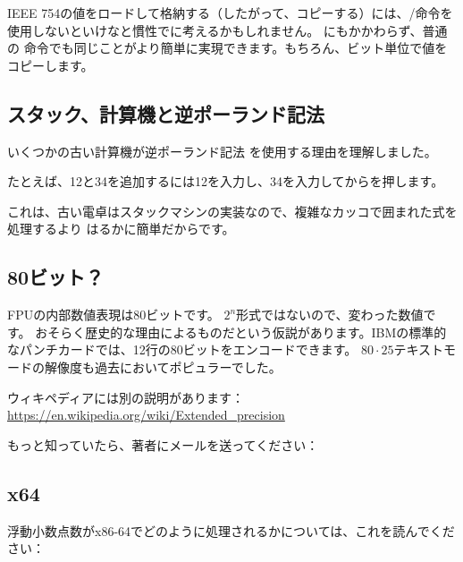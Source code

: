 IEEE 754の値をロードして格納する（したがって、コピーする）には、/命令を使用しないといけなと慣性でに考えるかもしれません。
にもかかわらず、普通の \MOV 命令でも同じことがより簡単に実現できます。もちろん、ビット単位で値をコピーします。

\subsection{スタック、計算機と逆ポーランド記法}


いくつかの古い計算機が逆ポーランド記法
を使用する理由を理解しました。

たとえば、12と34を追加するには12を入力し、34を入力してからを押します。

これは、古い電卓はスタックマシンの実装なので、複雑なカッコで囲まれた式を処理するより
はるかに簡単だからです。


\subsection{80ビット？}

FPUの内部数値表現は80ビットです。
$2^n$形式ではないので、変わった数値です。
おそらく歴史的な理由によるものだという仮説があります。IBMの標準的なパンチカードでは、12行の80ビットをエンコードできます。 
$80\cdot 25$テキストモードの解像度も過去においてポピュラーでした。

ウィキペディアには別の説明があります：\url{https://en.wikipedia.org/wiki/Extended_precision}

もっと知っていたら、著者にメールを送ってください： \EMAIL{}

\subsection{x64}

浮動小数点数がx86-64でどのように処理されるかについては、これを読んでください：


